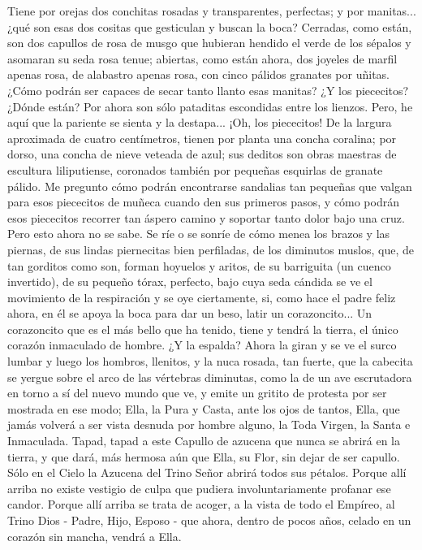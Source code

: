 \documentclass[12pt, twoside, openright]{book} %
\begin{document}
Tiene por orejas dos conchitas rosadas y transparentes, perfectas; y por manitas... ¿qué son esas dos cositas que gesticulan y buscan la boca? Cerradas, como están, son dos capullos de rosa de musgo que hubieran hendido el verde de los sépalos y asomaran su seda rosa tenue; abiertas, como están ahora, dos joyeles de marfil apenas rosa, de alabastro apenas rosa, con cinco pálidos granates por uñitas. ¿Cómo podrán ser capaces de secar tanto llanto esas manitas? ¿Y los piececitos? ¿Dónde están? Por ahora son sólo pataditas escondidas entre los lienzos. Pero, he aquí que la pariente se sienta y la destapa... ¡Oh, los piececitos! De la largura aproximada de cuatro centímetros, tienen por planta una concha coralina; por dorso, una concha de nieve veteada de azul; sus deditos son obras maestras de escultura liliputiense, coronados también por pequeñas esquirlas de granate pálido. Me pregunto cómo podrán encontrarse sandalias tan pequeñas que valgan para esos piececitos de muñeca cuando den sus primeros pasos, y cómo podrán esos piececitos recorrer tan áspero camino y soportar tanto dolor bajo una cruz. Pero esto ahora no se sabe. Se ríe o se sonríe de cómo menea los brazos y las piernas, de sus lindas piernecitas bien perfiladas, de los diminutos muslos, que, de tan gorditos como son, forman hoyuelos y aritos, de su barriguita (un cuenco invertido), de su pequeño tórax, perfecto, bajo cuya seda cándida se ve el movimiento de la respiración y se oye ciertamente, si, como hace el padre feliz ahora, en él se apoya la boca para dar un beso, latir un corazoncito... Un corazoncito que es el más bello que ha tenido, tiene y tendrá la tierra, el único corazón inmaculado de hombre. ¿Y la espalda? Ahora la giran y se ve el surco lumbar y luego los hombros, llenitos, y la nuca rosada, tan fuerte, que la cabecita se yergue sobre el arco de las vértebras diminutas, como la de un ave escrutadora en torno a sí del nuevo mundo que ve, y emite un gritito de protesta por ser mostrada en ese modo; Ella, la Pura y Casta, ante los ojos de tantos, Ella, que jamás volverá a ser vista desnuda por hombre alguno, la Toda Virgen, la Santa e Inmaculada. Tapad, tapad a este Capullo de azucena que nunca se abrirá en la tierra, y que dará, más hermosa aún que Ella, su Flor, sin dejar de ser capullo. Sólo en el Cielo la Azucena del Trino Señor abrirá todos sus pétalos. Porque allí arriba no existe vestigio de culpa que pudiera involuntariamente profanar ese candor. Porque allí arriba se trata de acoger, a la vista de todo el Empíreo, al Trino Dios - Padre, Hijo, Esposo - que ahora, dentro de pocos años, celado en un corazón sin mancha, vendrá a Ella. 
\end{document}
